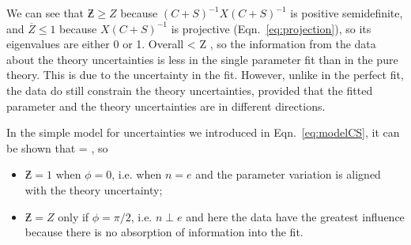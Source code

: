 We can see that $\Zbar \geq Z$ because $(C+S)^{-1} X (C+S)^{-1}$ is positive semidefinite, and $\overline{Z} \leq 1$ because $X(C+S)^{-1}$ is projective (Eqn.~\ref{eq:projection}), so its eigenvalues are either 0 or 1. Overall
 < Z \leq \Zbar {},
\ee
so the information from the data about the theory uncertainties is less in the single parameter fit than in the pure theory. This is due to the uncertainty in the fit. However, unlike in the perfect fit, the data do still constrain the theory uncertainties, provided that the fitted parameter and the theory uncertainties are in different directions.

In the simple model for uncertainties we introduced in Eqn.~\ref{eq:modelCS}, it can be shown that
\be 
\Zbar = ,
\ee
so 
\begin{itemize}
\item $\Zbar=1$ when $\phi=0$, i.e. when $n=e$ and the parameter variation is aligned with the theory uncertainty;
\item $\Zbar = Z$ only if $\phi=\pi/2$, i.e. $n \perp e$ and here the data have the greatest influence because there is no absorption of information into the fit.
\end{itemize}
 
